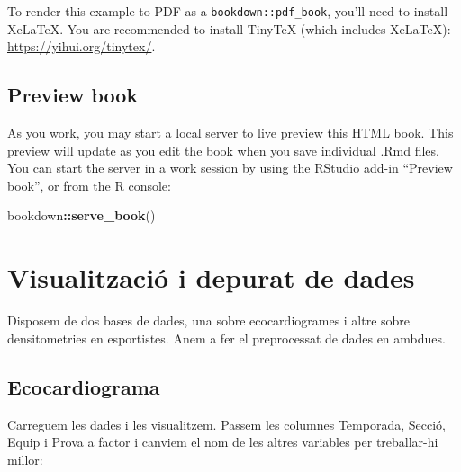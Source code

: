 \documentclass[
]{book}
\newenvironment{Shaded}{\begin{snugshade}}{\end{snugshade}}
\newcommand{\FunctionTok}[1]{\textcolor[rgb]{0.13,0.29,0.53}{\textbf{#1}}}
\newcommand{\NormalTok}[1]{#1}
\newcommand{\SpecialCharTok}[1]{\textcolor[rgb]{0.81,0.36,0.00}{\textbf{#1}}}
\theoremstyle{definition}
\theoremstyle{definition}
\theoremstyle{definition}
\theoremstyle{definition}
\theoremstyle{remark}
\begin{document}
To render this example to PDF as a \texttt{bookdown::pdf\_book}, you'll need to install XeLaTeX. You are recommended to install TinyTeX (which includes XeLaTeX): \url{https://yihui.org/tinytex/}.

\hypertarget{preview-book}{%
\section{Preview book}\label{preview-book}}

As you work, you may start a local server to live preview this HTML book. This preview will update as you edit the book when you save individual .Rmd files. You can start the server in a work session by using the RStudio add-in ``Preview book'', or from the R console:

\begin{Shaded}
\begin{Highlighting}[]
\NormalTok{bookdown}\SpecialCharTok{::}\FunctionTok{serve\_book}\NormalTok{()}
\end{Highlighting}
\end{Shaded}

\hypertarget{visualitzaciuxf3-i-depurat-de-dades}{%
\chapter{Visualització i depurat de dades}\label{visualitzaciuxf3-i-depurat-de-dades}}

Disposem de dos bases de dades, una sobre ecocardiogrames i altre sobre densitometries en esportistes. Anem a fer el preprocessat de dades en ambdues.

\hypertarget{ecocardiograma}{%
\section{Ecocardiograma}\label{ecocardiograma}}

Carreguem les dades i les visualitzem.
Passem les columnes Temporada, Secció, Equip i Prova a factor i canviem el nom de les altres variables per treballar-hi millor:
\end{document}
